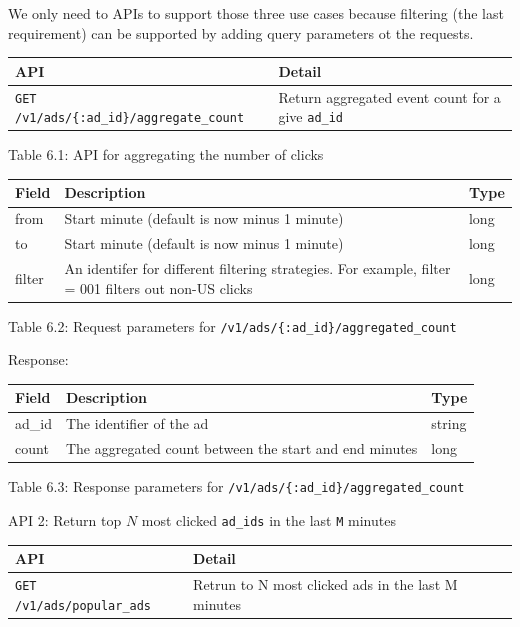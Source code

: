 \documentclass{report}
\theoremstyle{definition}
\begin{document}
We only need to APIs to support those three use cases because filtering (the last requirement) can be supported by adding query parameters ot the requests.

\begin{tabular}{|p{6cm}|p{6cm}|}
\hline
API & Detail \\
\hline
\lstinline|GET /v1/ads/{:ad_id}/aggregate_count| & Return aggregated event count for a give \lstinline|ad_id| \\
\hline
\end{tabular}

Table 6.1: API for aggregating the number of clicks

\begin{tabular}{|p{4cm}|p{4cm}|p{4cm}|}
\hline
\textbf{Field} & \textbf{Description} & \textbf{Type} \\
\hline
from & Start minute (default is now minus 1 minute) & long \\
\hline
to & Start minute (default is now minus 1 minute) & long \\
\hline
filter & An identifer for different filtering strategies. For example, filter = 001 filters out non-US clicks & long \\
\hline
\end{tabular}

Table 6.2: Request parameters for \lstinline|/v1/ads/{:ad_id}/aggregated_count|

Response:

\begin{tabular}{|p{4cm}|p{4cm}|p{4cm}|}
\hline
\textbf{Field} & \textbf{Description} & \textbf{Type} \\
\hline
ad\_id & The identifier of the ad & string \\
\hline
count & The aggregated count between the start and end minutes & long \\
\hline
\end{tabular}

Table 6.3: Response parameters for \lstinline|/v1/ads/{:ad_id}/aggregated_count|

API 2: Return top $N$ most clicked \lstinline|ad_ids| in the last \lstinline|M| minutes

\begin{tabular}{|p{6cm}|p{6cm}|}
\hline
\textbf{API} & \textbf{Detail} \\
\hline
\lstinline|GET /v1/ads/popular_ads| & Retrun to N most clicked ads in the last M minutes \\
\hline
\end{tabular}
\end{document}
